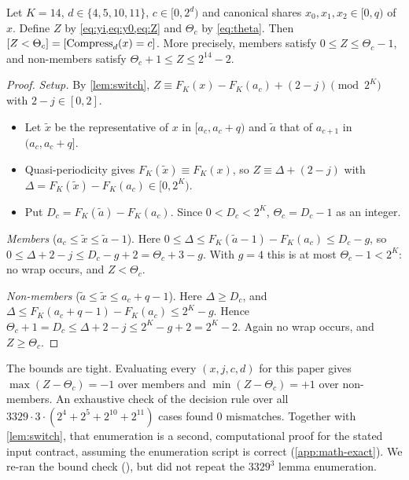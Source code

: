 \begin{proposition}\label{prop:exact}
Let $K = 14$, $d \in \{4,5,10,11\}$, $c \in [0, 2^d)$ and canonical shares $x_0, x_1, x_2 \in [0, q)$ of $x$. Define $Z$ by \cref{eq:yi,eq:y0,eq:Z} and $\Theta_c$ by \cref{eq:theta}. Then $[Z < \Theta_c] = [\operatorname{Compress}_d(x) = c]$. More precisely, members satisfy $0 \le Z \le \Theta_c - 1$, and non-members satisfy $\Theta_c + 1 \le Z \le 2^{14} - 2$.
\end{proposition}
\begin{proof}
\emph{Setup.} By \cref{lem:switch}, $Z \equiv F_K(x) - F_K(a_c) + (2 - j) \pmod{2^K}$ with $2 - j \in [0, 2]$.
\begin{itemize}
  \item Let $\tilde x$ be the representative of $x$ in $[a_c, a_c + q)$ and $\tilde a$ that of $a_{c+1}$ in $(a_c, a_c + q]$.
  \item Quasi-periodicity gives $F_K(\tilde x) \equiv F_K(x)$, so $Z \equiv \Delta + (2 - j)$ with $\Delta = F_K(\tilde x) - F_K(a_c) \in [0, 2^K)$.
  \item Put $D_c = F_K(\tilde a) - F_K(a_c)$. Since $0 < D_c < 2^K$, $\Theta_c = D_c - 1$ as an integer.
\end{itemize}

\emph{Members} ($a_c \le \tilde x \le \tilde a - 1$). Here $0 \le \Delta \le F_K(\tilde a - 1) - F_K(a_c) \le D_c - g$, so $0 \le \Delta + 2 - j \le D_c - g + 2 = \Theta_c + 3 - g$. With $g = 4$ this is at most $\Theta_c - 1 < 2^K$: no wrap occurs, and $Z < \Theta_c$.

\emph{Non-members} ($\tilde a \le \tilde x \le a_c + q - 1$). Here $\Delta \ge D_c$, and $\Delta \le F_K(a_c + q - 1) - F_K(a_c) \le 2^K - g$. Hence $\Theta_c + 1 = D_c \le \Delta + 2 - j \le 2^K - g + 2 = 2^K - 2$. Again no wrap occurs, and $Z \ge \Theta_c$.
\end{proof}
The bounds are tight. Evaluating every $(x, j, c, d)$ for this paper gives $\max(Z - \Theta_c) = -1$ over members and $\min(Z - \Theta_c) = +1$ over non-members. An exhaustive check of the decision rule over all $3329 \cdot 3 \cdot (2^4 + 2^5 + 2^{10} + 2^{11})$ cases found 0 mismatches. Together with \cref{lem:switch}, that enumeration is a second, computational proof for the stated input contract, assuming the enumeration script is correct (\cref{app:math-exact}). We re-ran the bound check (), but did not repeat the $3329^3$ lemma enumeration.

